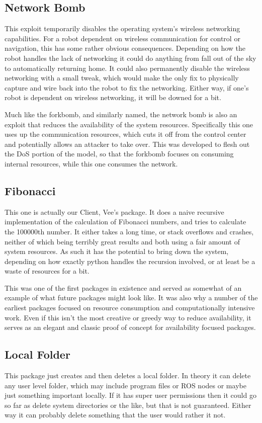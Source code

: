 \documentclass[IEEEtran,letterpaper,10pt,notitlepage,draftclsnofoot]{article}
\begin{document}
\subsection{Network Bomb}
This exploit temporarily disables the operating system's wireless networking capabilities.
For a robot dependent on wireless communication for control or navigation, this has some rather obvious consequences.
Depending on how the robot handles the lack of networking it could do anything from fall out of the sky to automatically
returning home. It could also permanently disable the wireless networking with a small tweak, which would make the only
fix to physically capture and wire back into the robot to fix the networking.
Either way, if one's robot is dependent on wireless networking, it will be downed for a bit.

Much like the forkbomb, and similarly named, the network bomb is also an exploit that reduces the availability of the system resources.
Specifically this one uses up the communication resources, which cuts it off from the control center and potentially allows an attacker to take over.
This was developed to flesh out the DoS portion of the model, so that the forkbomb focuses on consuming internal resources, while this one consumes the network.

\subsection{Fibonacci}
This one is actually our Client, Vee's package. It does a naive recursive implementation of the calculation of Fibonacci
numbers, and tries to calculate the 100000th number. It either takes a long time, or stack overflows and crashes, neither
of which being terribly great results and both using a fair amount of system resources. As such it has the potential to
bring down the system, depending on how exactly python handles the recursion involved, or at least be a waste of resources
for a bit.

This was one of the first packages in existence and served as somewhat of an example of what future packages might look like.
It was also why a number of the earliest packages focused on resource consumption and computationally intensive work.
Even if this isn't the most creative or greedy way to reduce availability, it serves as an elegant and classic proof of concept for availability focused packages.

\subsection{Local Folder}
This package just creates and then deletes a local folder. In theory it can delete any user level folder, which may include
program files or ROS nodes or maybe just something important locally. If it has super user permissions then it could go so
far as delete system directories or the like, but that is not guaranteed. Either way it can probably delete something that
the user would rather it not.
\end{document}
